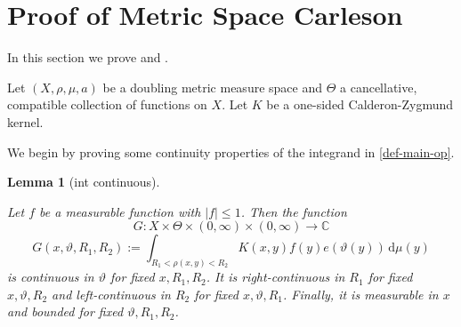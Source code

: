 \documentclass[10pt,a4paper]{article}
\theoremstyle{plain}
\newtheorem{lemma}[theorem]{Lemma}
\theoremstyle{definition}
\numberwithin{equation}{subsection}
\newcommand{\mfa}{{\vartheta}}
\newcommand{\lean}[1]{}
\newcommand{\leanok}{}
\begin{document}
\section{Proof of Metric Space Carleson}
\label{thmfromproplinear}

In this section we prove  and .

Let $(X, \rho, \mu, a)$ be a doubling metric measure space and $\Theta$ a cancellative, compatible collection of functions on $X$. Let $K$ be a one-sided Calderon-Zygmund kernel.

We begin by proving some continuity properties of the integrand in \eqref{def-main-op}.

\begin{lemma}[int continuous]
    \label{int-continuous}
    \leanok
    \lean{continuous_carlesonOperatorIntegrand, rightContinuous_carlesonOperatorIntegrand, leftContinuous_carlesonOperatorIntegrand, measurable_carlesonOperatorIntegrand, enorm_carlesonOperatorIntegrand_le}
    Let $f$ be a measurable function with $|f| \le 1$. Then the function
    \[
        G: X \times \Theta \times (0,\infty) \times (0, \infty) \to \mathbb{C}
    \]
    \[
        G(x, \mfa, R_1, R_2) := \int_{R_1 < \rho(x,y) < R_2} K(x,y) f(y) e(\mfa(y)) \, \mathrm{d}\mu(y)
    \]
    is continuous in $\mfa$ for fixed $x, R_1, R_2$. It is right-continuous in $R_1$ for fixed $x, \vartheta, R_2$ and left-continuous in $R_2$ for fixed $x, \vartheta, R_1$. Finally, it is measurable in $x$ and bounded for fixed $\vartheta, R_1, R_2$.
\end{lemma}
\end{document}
